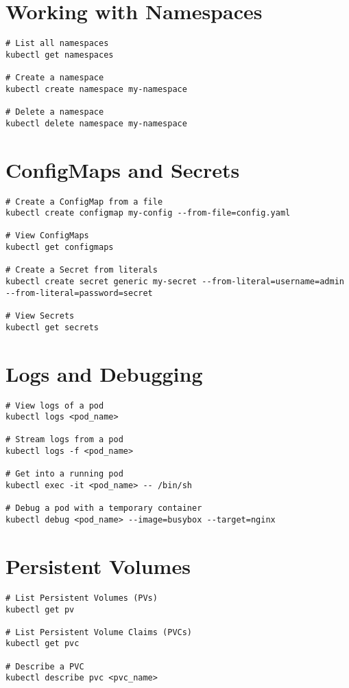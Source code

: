 \documentclass[11pt]{article}
\begin{document}
    \section*{Working with Namespaces}
    \begin{lstlisting}[style=kubeStyle]
# List all namespaces
kubectl get namespaces

# Create a namespace
kubectl create namespace my-namespace

# Delete a namespace
kubectl delete namespace my-namespace
    \end{lstlisting}

    \section*{ConfigMaps and Secrets}
    \begin{lstlisting}[style=kubeStyle]
# Create a ConfigMap from a file
kubectl create configmap my-config --from-file=config.yaml

# View ConfigMaps
kubectl get configmaps

# Create a Secret from literals
kubectl create secret generic my-secret --from-literal=username=admin --from-literal=password=secret

# View Secrets
kubectl get secrets
    \end{lstlisting}

    \section*{Logs and Debugging}
    \begin{lstlisting}[style=kubeStyle]
# View logs of a pod
kubectl logs <pod_name>

# Stream logs from a pod
kubectl logs -f <pod_name>

# Get into a running pod
kubectl exec -it <pod_name> -- /bin/sh

# Debug a pod with a temporary container
kubectl debug <pod_name> --image=busybox --target=nginx
    \end{lstlisting}

    \section*{Persistent Volumes}
    \begin{lstlisting}[style=kubeStyle]
# List Persistent Volumes (PVs)
kubectl get pv

# List Persistent Volume Claims (PVCs)
kubectl get pvc

# Describe a PVC
kubectl describe pvc <pvc_name>
    \end{lstlisting}
\end{document}
